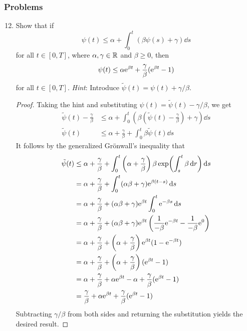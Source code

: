 \documentclass[../notes.tex]{subfiles}
\begin{document}
\subsubsection*{Problems}
\begin{enumerate}[label={\textbf{2.\arabic*.}},ref={2.\arabic*},leftmargin=3.5em]
    \setcounter{enumi}{11}
    \item \label{prb:2.12}Show that if
    \begin{equation*}
        \psi(t) \leq \alpha+\int_0^t(\beta\psi(s)+\gamma)\dd{s}
    \end{equation*}
    for all $t\in[0,T]$, where $\alpha,\gamma\in\R$ and $\beta\geq 0$, then
    \begin{equation*}
        \psi(t) \leq \alpha\e[\beta t]+\frac{\gamma}{\beta}(\e[\beta t]-1)
    \end{equation*}
    for all $t\in[0,T]$. \emph{Hint}: Introduce $\tilde{\psi}(t)=\psi(t)+\gamma/\beta$.
    \begin{proof}
        Taking the hint and substituting $\psi(t)=\tilde{\psi}(t)-\gamma/\beta$, we get
        \begin{align*}
            \tilde{\psi}(t)-\frac{\gamma}{\beta} &\leq \alpha+\int_0^t\left( \beta\left( \tilde{\psi}(t)-\frac{\gamma}{\beta} \right)+\gamma \right)\dd{s}\\
            \tilde{\psi}(t) &\leq \alpha+\frac{\gamma}{\beta}+\int_0^t\beta\tilde{\psi}(t)\dd{s}
        \end{align*}
        It follows by the generalized Gr\"{o}nwall's inequality that
        \begin{align*}
            \tilde{\psi}(t) &\leq \alpha+\frac{\gamma}{\beta}+\int_0^t\left( \alpha+\frac{\gamma}{\beta} \right)\beta\exp(\int_s^t\beta\dd{r})\dd{s}\\
            &= \alpha+\frac{\gamma}{\beta}+\int_0^t(\alpha\beta+\gamma)\e[\beta(t-s)]\dd{s}\\
            &= \alpha+\frac{\gamma}{\beta}+(\alpha\beta+\gamma)\e[\beta t]\int_0^t\e[-\beta s]\dd{s}\\
            &= \alpha+\frac{\gamma}{\beta}+(\alpha\beta+\gamma)\e[\beta t]\left( \frac{1}{-\beta}\e[-\beta t]-\frac{1}{-\beta}\e[0] \right)\\
            &= \alpha+\frac{\gamma}{\beta}+\left( \alpha+\frac{\gamma}{\beta} \right)\e[\beta t](1-\e[-\beta t])\\
            &= \alpha+\frac{\gamma}{\beta}+\left( \alpha+\frac{\gamma}{\beta} \right)(\e[\beta t]-1)\\
            &= \alpha+\frac{\gamma}{\beta}+\alpha\e[\beta t]-\alpha+\frac{\gamma}{\beta}(\e[\beta t]-1)\\
            &= \frac{\gamma}{\beta}+\alpha\e[\beta t]+\frac{\gamma}{\beta}(\e[\beta t]-1)
        \end{align*}
        Subtracting $\gamma/\beta$ from both sides and returning the substitution yields the desired result.
    \end{proof}
\end{enumerate}
\end{document}
